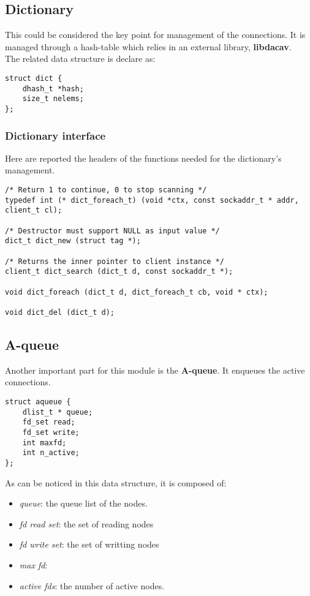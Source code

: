 \subsection{Dictionary}
This could be considered the key point for management of the connections. It is managed through a hash-table
which relies in an external library, \textbf{libdacav}.\\
The related data structure is declare as:
\begin{lstlisting}
struct dict {
    dhash_t *hash;
    size_t nelems;
};
\end{lstlisting}

\subsubsection{Dictionary interface}
Here are reported the headers of the functions needed for the dictionary's management.
\begin{lstlisting}
/* Return 1 to continue, 0 to stop scanning */
typedef int (* dict_foreach_t) (void *ctx, const sockaddr_t * addr,
client_t cl);

/* Destructor must support NULL as input value */
dict_t dict_new (struct tag *);

/* Returns the inner pointer to client instance */
client_t dict_search (dict_t d, const sockaddr_t *);

void dict_foreach (dict_t d, dict_foreach_t cb, void * ctx);

void dict_del (dict_t d);
\end{lstlisting}

\subsection{A-queue}
Another important part for this module is the \textbf{A-queue}. It enqueues the active connections.
\begin{lstlisting}
struct aqueue {
    dlist_t * queue;
    fd_set read;
    fd_set write;
    int maxfd;
    int n_active;
};
\end{lstlisting}
As can be noticed in this data structure, it is composed of:
\begin{itemize}
\item \textit{queue}: the queue list of the nodes.
\item \textit{fd read set}: the set of reading nodes
\item \textit{fd write set}: the set of writting nodes
\item \textit{max fd}: 
\item \textit{active fds}: the number of active nodes.
\end{itemize}
